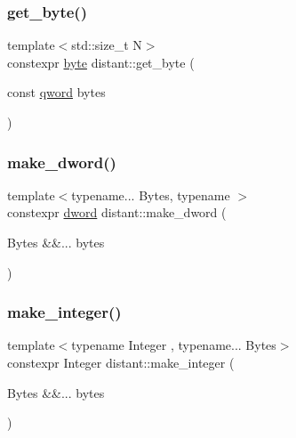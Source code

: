 \subsubsection{\texorpdfstring{get\+\_\+byte()}{get\_byte()}\hspace{0.1cm}{\footnotesize\ttfamily [3/3]}}
{\footnotesize\ttfamily template$<$std\+::size\+\_\+t N$>$ \\
constexpr \mbox{\hyperlink{namespacedistant_af9c3f04a9b855a1368d6c1a9ce28c2f4}{byte}} distant\+::get\+\_\+byte (\begin{DoxyParamCaption}\item[{const \mbox{\hyperlink{namespacedistant_ac5f83107c559f04950d4c9fa5464364e}{qword}}}]{bytes }\end{DoxyParamCaption})\hspace{0.3cm}{\ttfamily [noexcept]}}

\mbox{\label{namespacedistant_a0a3f95b6bfb10c1a6c55fb2d33714869}} 
\subsubsection{\texorpdfstring{make\+\_\+dword()}{make\_dword()}}
{\footnotesize\ttfamily template$<$typename... Bytes, typename $>$ \\
constexpr \mbox{\hyperlink{namespacedistant_a9fa41a5a1a17dcbd24da1c1855c92489}{dword}} distant\+::make\+\_\+dword (\begin{DoxyParamCaption}\item[{Bytes \&\&...}]{bytes }\end{DoxyParamCaption})\hspace{0.3cm}{\ttfamily [noexcept]}}

\mbox{\label{namespacedistant_a6c4109cf2d298ee058cb32412f7c82ae}} 
\subsubsection{\texorpdfstring{make\+\_\+integer()}{make\_integer()}}
{\footnotesize\ttfamily template$<$typename Integer , typename... Bytes$>$ \\
constexpr Integer distant\+::make\+\_\+integer (\begin{DoxyParamCaption}\item[{Bytes \&\&...}]{bytes }\end{DoxyParamCaption})\hspace{0.3cm}{\ttfamily [noexcept]}}

